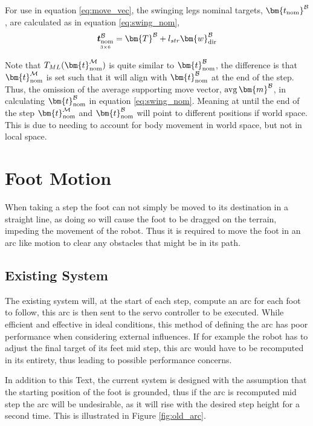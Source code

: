         For use in equation \ref{eq:move_vec}, the swinging legs nominal targets, \(\bm{t_\text{nom}} ^\fbody\), are calculated as 
        in equation \ref{eq:swing_nom},
        \begin{equation} \label{eq:swing_nom}
            \mdim{\boldsymbol{t}_\text{nom}^\fbody}{3}{6} = \bm{T}^\fbody + l_{str}\bm{w}_\text{dir}^\fbody
        \end{equation}

        Note that \(\transframe{\bm{t}_\text{nom}^{\fmap}}{M}{L}\) is quite similar to \(\bm{t}_\text{nom}^\fbody\), the difference is that \(\bm{t}_\text{nom}^{\fmap}\) is set such that it
        will align with \(\bm{t}_\text{nom}^\fbody\)
        at the end of the step. Thus, the omission of the average supporting move vector, \(\avg \bm{m}^\fbody\), in calculating \(\bm{t}_\text{nom}^\fbody\)
        in equation \ref{eq:swing_nom}.
        Meaning at until the end of the step \(\bm{t}_\text{nom}\inrefframe{M}\) and \(\bm{t}_\text{nom}^\fbody\) will point 
        to different positions if world space. This is due to needing to account for body movement in world space, but not in local space.

    \newpage
    \section{Foot Motion} \label{sec:arc_generation}
    When taking a step the foot can not simply be moved to its destination in a straight line, as doing so will cause the foot to be dragged on the terrain,
    impeding the movement of the robot. Thus it is required to move the foot in an arc like motion to clear any obstacles that might be in its path.


    \subsection{Existing System}
        The existing system will, at the start of each step, compute an arc for each foot to follow, this arc is then sent to the servo controller
        to be executed. While efficient and effective in ideal conditions, this method of defining the arc has poor performance when considering external
        influences. If for example the robot has to adjust the final target of its feet mid step, this arc would have to be recomputed in its entirety,
        thus leading to possible performance concerns.

        In addition to this Text, the current system is designed with the assumption that the starting position of the foot is grounded, thus if the arc is recomputed
        mid step the arc will be undesirable, as it will rise with the desired step height for a second time. This is illustrated in Figure \ref{fig:old_arc}.

